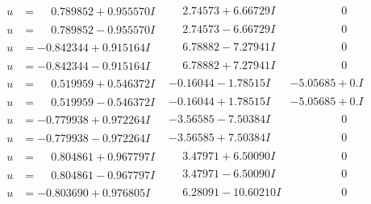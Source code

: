 \documentclass[1p]{elsarticle_modified}
\theoremstyle{definition}
\begin{document}
$$\begin{array}{c|c|c}
\begin{aligned}
u &= \phantom{-}0.789852 + 0.955570 I\end{aligned}
 & \phantom{-}2.74573 + 6.66729 I & \phantom{-0.000000 } 0 \\ \hline\begin{aligned}
u &= \phantom{-}0.789852 - 0.955570 I\end{aligned}
 & \phantom{-}2.74573 - 6.66729 I & \phantom{-0.000000 } 0 \\ \hline\begin{aligned}
u &= -0.842344 + 0.915164 I\end{aligned}
 & \phantom{-}6.78882 - 7.27941 I & \phantom{-0.000000 } 0 \\ \hline\begin{aligned}
u &= -0.842344 - 0.915164 I\end{aligned}
 & \phantom{-}6.78882 + 7.27941 I & \phantom{-0.000000 } 0 \\ \hline\begin{aligned}
u &= \phantom{-}0.519959 + 0.546372 I\end{aligned}
 & -0.16044 - 1.78515 I & -5.05685 + 0. I\phantom{ +0.000000I} \\ \hline\begin{aligned}
u &= \phantom{-}0.519959 - 0.546372 I\end{aligned}
 & -0.16044 + 1.78515 I & -5.05685 + 0. I\phantom{ +0.000000I} \\ \hline\begin{aligned}
u &= -0.779938 + 0.972264 I\end{aligned}
 & -3.56585 - 7.50384 I & \phantom{-0.000000 } 0 \\ \hline\begin{aligned}
u &= -0.779938 - 0.972264 I\end{aligned}
 & -3.56585 + 7.50384 I & \phantom{-0.000000 } 0 \\ \hline\begin{aligned}
u &= \phantom{-}0.804861 + 0.967797 I\end{aligned}
 & \phantom{-}3.47971 + 6.50090 I & \phantom{-0.000000 } 0 \\ \hline\begin{aligned}
u &= \phantom{-}0.804861 - 0.967797 I\end{aligned}
 & \phantom{-}3.47971 - 6.50090 I & \phantom{-0.000000 } 0 \\ \hline\begin{aligned}
u &= -0.803690 + 0.976805 I\end{aligned}
 & \phantom{-}6.28091 - 10.60210 I & \phantom{-0.000000 } 0 \\ \hline\begin{aligned}

\end{aligned}
\end{array}$$
\end{document}
